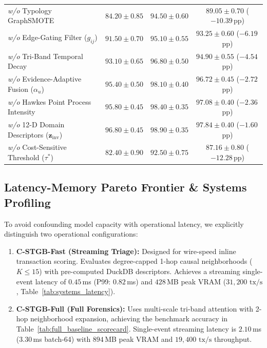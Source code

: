 \begin{table}[t]
{\begin{tabular}{lcccccc}
\textit{w/o} Typology GraphSMOTE & \multicolumn{2}{c}{$84.20 \pm 0.85$} & \multicolumn{2}{c}{$94.50 \pm 0.60$} & \multicolumn{2}{c}{$89.05 \pm 0.70$ ($-10.39$\,pp)} \\
\textit{w/o} Edge-Gating Filter ($g_{ij}$) & \multicolumn{2}{c}{$91.50 \pm 0.70$} & \multicolumn{2}{c}{$95.10 \pm 0.55$} & \multicolumn{2}{c}{$93.25 \pm 0.60$ ($-6.19$\,pp)} \\
\textit{w/o} Tri-Band Temporal Decay & \multicolumn{2}{c}{$93.10 \pm 0.65$} & \multicolumn{2}{c}{$96.80 \pm 0.50$} & \multicolumn{2}{c}{$94.90 \pm 0.55$ ($-4.54$\,pp)} \\
\textit{w/o} Evidence-Adaptive Fusion ($\alpha_u$) & \multicolumn{2}{c}{$95.40 \pm 0.50$} & \multicolumn{2}{c}{$98.10 \pm 0.40$} & \multicolumn{2}{c}{$96.72 \pm 0.45$ ($-2.72$\,pp)} \\
\textit{w/o} Hawkes Point Process Intensity & \multicolumn{2}{c}{$95.80 \pm 0.45$} & \multicolumn{2}{c}{$98.40 \pm 0.35$} & \multicolumn{2}{c}{$97.08 \pm 0.40$ ($-2.36$\,pp)} \\
\textit{w/o} 12-D Domain Descriptors ($\mathbf{z}_{\text{inv}}$) & \multicolumn{2}{c}{$96.80 \pm 0.45$} & \multicolumn{2}{c}{$98.90 \pm 0.35$} & \multicolumn{2}{c}{$97.84 \pm 0.40$ ($-1.60$\,pp)} \\
\textit{w/o} Cost-Sensitive Threshold ($\tau^*$) & \multicolumn{2}{c}{$82.40 \pm 0.90$} & \multicolumn{2}{c}{$92.50 \pm 0.75$} & \multicolumn{2}{c}{$87.16 \pm 0.80$ ($-12.28$\,pp)} \\
\bottomrule
\end{tabular}%
}
\end{table}

\subsection{Latency-Memory Pareto Frontier \& Systems Profiling}
\label{sec:latency_results}
To avoid confounding model capacity with operational latency, we explicitly distinguish two operational configurations:
\begin{enumerate}
    \item \textbf{C-STGB-Fast (Streaming Triage):} Designed for wire-speed inline transaction scoring. Evaluates degree-capped 1-hop causal neighborhoods ($K \le 15$) with pre-computed DuckDB descriptors. Achieves a streaming single-event latency of $0.45$\,ms (P99: $0.82$\,ms) and $428$\,MB peak VRAM ($31,200\text{ tx/s}$, Table~\ref{tab:systems_latency}).
    \item \textbf{C-STGB-Full (Full Forensics):} Uses multi-scale tri-band attention with 2-hop neighborhood expansion, achieving the benchmark accuracy in Table~\ref{tab:full_baseline_scorecard}. Single-event streaming latency is $2.10$\,ms ($3.30$\,ms batch-64) with $894$\,MB peak VRAM and $19,400\text{ tx/s}$ throughput.
\end{enumerate}

